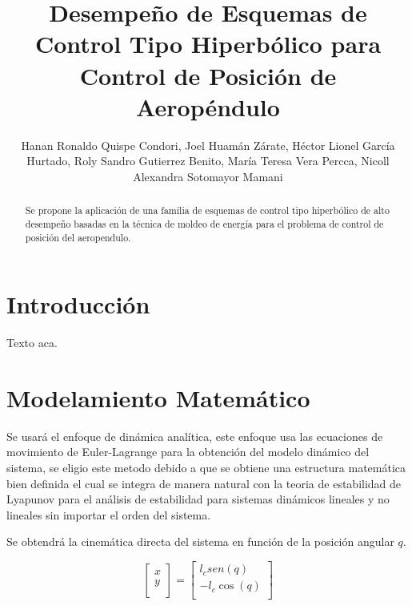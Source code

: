 \documentclass[a4paper]{IEEEtran} %
\begin{document}
\title{Desempeño de Esquemas de Control Tipo Hiperbólico para Control de Posición de Aeropéndulo}
\author{Hanan Ronaldo Quispe Condori, Joel Huamán Zárate, Héctor Lionel García Hurtado, Roly Sandro Gutierrez Benito, María Teresa Vera Percca, Nicoll Alexandra Sotomayor Mamani}
\maketitle
\begin{abstract}
    Se propone la aplicación de una familia de esquemas de control tipo hiperbólico de alto desempeño basadas en la técnica de moldeo de energía para el problema de control de posición del aeropendulo.
\end{abstract}
\section{Introducción}
Texto aca\cite{gunnel2017tuning}.
\section{Modelamiento Matemático}
\label{sec:modeling}
Se usará el enfoque de dinámica analítica, este enfoque usa las ecuaciones de movimiento de Euler-Lagrange para la obtención del modelo dinámico del sistema, se eligio este metodo debido a que se obtiene una estructura matemática bien definida el cual se integra de manera natural con la teoria de estabilidad de Lyapunov para el análisis de estabilidad para sistemas dinámicos lineales y no lineales sin importar el orden del sistema.\cite{reyes2019drones}

Se obtendrá la cinemática directa del sistema en función de la posición angular $q$.

\begin{equation}
    \begin{bmatrix}  x \\ y \\
    \end{bmatrix}=
    \begin{bmatrix} l_csen(q) \\ -l_c\cos(q)  \\
    \end{bmatrix}
    \label{eq:cin_direc}
\end{equation}
\end{document}
